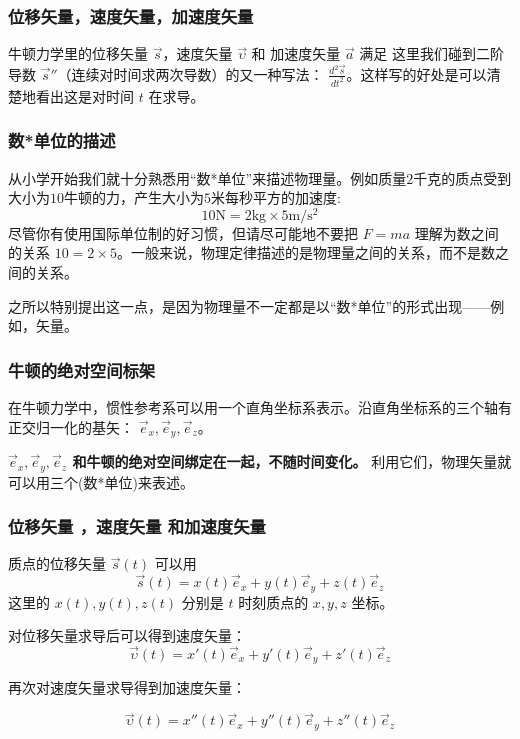 \documentclass[CJK,13pt]{beamer}
\begin{document}
\begin{frame}
  \frametitle{位移矢量，速度矢量，加速度矢量}
  牛顿力学里的位移矢量 $\vec{s}$，速度矢量 $\vec{\upsilon}$ 和 加速度矢量 $\vec{a}$ 满足
  这里我们碰到二阶导数 $\vec{s}''$（连续对时间求两次导数）的又一种写法： $\frac{d^2\vec{s}}{dt^2}$。这样写的好处是可以清楚地看出这是对时间 $t$ 在求导。
\end{frame}


\begin{frame}
  \frametitle{数*单位的描述}
  从小学开始我们就十分熟悉用“数*单位”来描述物理量。例如质量{\blue $2$千克}的质点受到大小为{\blue $10$牛顿}的力，产生大小为{\blue $5$米每秒平方}的加速度:
  $$10\mathrm{N} = 2\mathrm{kg} \times 5\mathrm{m/s^2}$$
  尽管你有使用国际单位制的好习惯，但请尽可能地不要把 $F=ma$ 理解为数之间的关系 $10=2\times 5$。一般来说，{\blue 物理定律描述的是物理量之间的关系，而不是数之间的关系}。

  \skipline
  
  之所以特别提出这一点，是因为物理量不一定都是以“数*单位”的形式出现——例如，矢量。
\end{frame}



\begin{frame}
  \frametitle{牛顿的绝对空间标架}
  在牛顿力学中，惯性参考系可以用一个直角坐标系表示。沿直角坐标系的三个轴有正交归一化的基矢： $\vec{e}_x,\vec{e}_y, \vec{e}_z$。

  {\bf $\vec{e}_x,\vec{e}_y, \vec{e}_z$ 和牛顿的绝对空间绑定在一起，不随时间变化。}  利用它们，物理矢量就可以用三个(数*单位)来表述。
\end{frame}


\begin{frame}
  \frametitle{位移矢量 ，速度矢量 和加速度矢量}
  质点的位移矢量 $\vec{s}(t)$ 可以用
  $$ \vec{s}(t) = x(t) \vec{e}_x  + y(t) \vec{e}_y + z(t)\vec{e}_z $$
  这里的 $x(t), y(t), z(t)$ 分别是 $t$ 时刻质点的 $x, y, z$ 坐标。

  \skipline

  对位移矢量求导后可以得到速度矢量：
  $$ \vec{\upsilon}(t) =  x'(t) \vec{e}_x  + y'(t) \vec{e}_y + z'(t)\vec{e}_z $$

  再次对速度矢量求导得到加速度矢量：

  $$ \vec{\upsilon}(t) =  x''(t) \vec{e}_x  + y''(t) \vec{e}_y + z''(t)\vec{e}_z $$
\end{frame}
\end{document}

